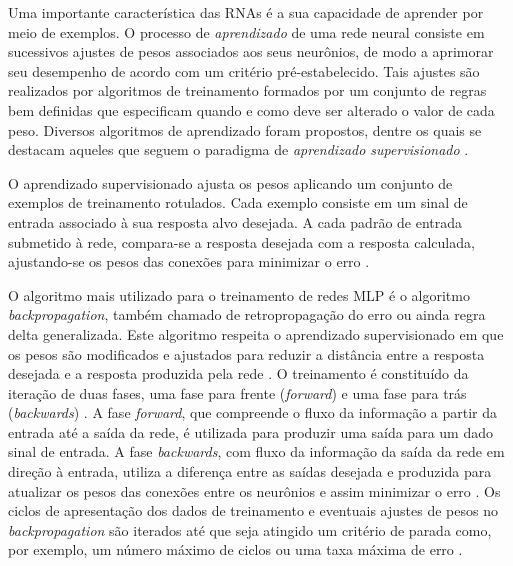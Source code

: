 
Uma importante característica das RNAs é a sua capacidade de aprender por meio de exemplos. O processo de \emph{aprendizado} de uma rede neural consiste em sucessivos ajustes de pesos associados aos seus neurônios, de modo a aprimorar seu desempenho de acordo com um critério pré-estabelecido. Tais ajustes são realizados por algoritmos de treinamento formados por um conjunto de regras bem definidas que especificam quando e como deve ser alterado o valor de cada peso. Diversos algoritmos de aprendizado foram propostos, dentre os quais se destacam aqueles que seguem o paradigma de \emph{aprendizado supervisionado} \cite{ref:faceli,ref:patrick-tcc}.


O aprendizado supervisionado ajusta os pesos aplicando um conjunto de exemplos de treinamento rotulados. Cada exemplo consiste em um sinal de entrada associado à sua resposta alvo desejada. A cada padrão de entrada submetido à rede, compara-se a resposta desejada com a resposta calculada, ajustando-se os pesos das conexões para minimizar o erro \cite{ref:haykin}.


O algoritmo mais utilizado para o treinamento de redes MLP é o algoritmo \emph{backpropagation}, também chamado de retropropagação do erro ou ainda regra delta generalizada. Este algoritmo respeita o aprendizado supervisionado em que os pesos são modificados e ajustados para reduzir a distância entre a resposta desejada e a resposta produzida pela rede \cite{ref:haykin}. O treinamento é constituído da iteração de duas fases, uma fase para frente (\emph{forward}) e uma fase para trás (\emph{backwards}) \cite{ref:faceli}. A fase \emph{forward}, que compreende o fluxo da informação a partir da entrada até a saída da rede, é utilizada para produzir uma saída para um dado sinal de entrada. A fase \emph{backwards}, com fluxo da informação da saída da rede em direção à entrada, utiliza a diferença entre as saídas desejada e produzida para atualizar os pesos das conexões entre os neurônios e assim minimizar o erro \cite{ref:teresa}. Os ciclos de apresentação dos dados de treinamento e eventuais ajustes de pesos no \emph{backpropagation} são iterados até que seja atingido um critério de parada como, por exemplo, um número máximo de ciclos ou uma taxa máxima de erro \cite{ref:faceli}.



